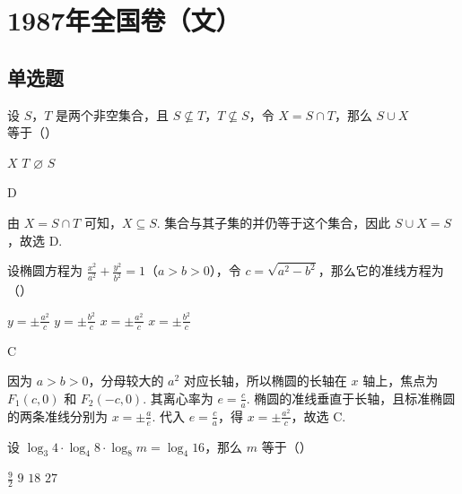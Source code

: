\documentclass[UTF8,a4paper,oneside,11pt]{ctexbook}
\begin{document}
\mainmatter

\chapter{1987年全国卷（文）}

\section{单选题}

\begin{problem}
设 \(S\)，\(T\) 是两个非空集合，且 \(S \not\subseteq T\)，\(T \not\subseteq S\)，令 \(X = S \cap T\)，那么 \(S \cup X\) 等于（\quad）

\choices
    {\(X\)}
    {\(T\)}
    {\(\varnothing\)}
    {\(S\)}
\end{problem}

\begin{answer}
D
\end{answer}

\begin{solution}
由 \(X=S\cap T\) 可知，\(X\subseteq S\). 集合与其子集的并仍等于这个集合，因此 \(S\cup X=S\)，故选 D.
\end{solution}

\begin{problem}
设椭圆方程为 \(\frac{x^2}{a^2} + \frac{y^2}{b^2} = 1\)（\(a > b > 0\)），令 \(c = \sqrt{a^2 - b^2}\)，那么它的准线方程为（\quad）

\choices
    {\(y = \pm \frac{a^2}{c}\)}
    {\(y = \pm \frac{b^2}{c}\)}
    {\(x = \pm \frac{a^2}{c}\)}
    {\(x = \pm \frac{b^2}{c}\)}
\end{problem}

\begin{answer}
C
\end{answer}

\begin{solution}
因为 \(a>b>0\)，分母较大的 \(a^2\) 对应长轴，所以椭圆的长轴在 \(x\) 轴上，焦点为 \(F_1(c,0)\) 和 \(F_2(-c,0)\). 其离心率为 \(e=\frac ca\). 椭圆的准线垂直于长轴，且标准椭圆的两条准线分别为 \(x=\pm\frac ae\). 代入 \(e=\frac ca\)，得 \(x=\pm\frac{a^2}{c}\)，故选 C.
\end{solution}

\begin{problem}
设 \(\log_3 4 \cdot \log_4 8 \cdot \log_8 m = \log_4 16\)，那么 \(m\) 等于（\quad）

\choices
    {\(\frac{9}{2}\)}
    {\(9\)}
    {\(18\)}
    {\(27\)}
\end{problem}
\end{document}
